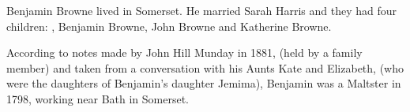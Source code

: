 
Benjamin Browne lived in Somerset. He married Sarah Harris and they had four children: , Benjamin Browne, John Browne and Katherine Browne.

According to notes made by John Hill Munday in 1881, (held by a family member) and taken from a conversation with his Aunts Kate and Elizabeth, (who were the daughters of Benjamin's daughter Jemima),  Benjamin was a Maltster in 1798, working near Bath in Somerset.

